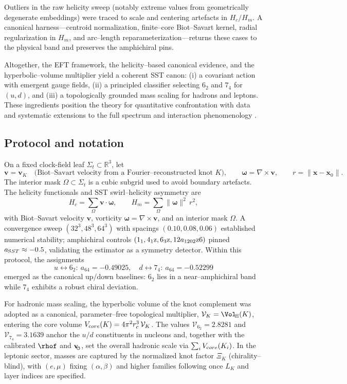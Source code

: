 \documentclass[11pt, preprint,titlepage]{revtex4-2}
\newcommand{\swirlarrow}{\!\!\scriptsize\boldsymbol{\circlearrowleft}}
\newcommand{\vswirl}{\mathbf{v}_{\swirlarrow}}
\begin{document}
    Outliers in the raw helicity sweep (notably extreme values from geometrically degenerate embeddings) were traced to scale and centering artefacts in \(H_c/H_m\). A canonical harness—centroid normalization, finite–core Biot–Savart kernel, radial regularization in \(H_m\), and arc–length reparameterization—returns these cases to the physical band and preserves the amphichiral pins.

    Altogether, the EFT framework, the helicity–based canonical evidence, and the hyperbolic–volume multiplier yield a coherent SST canon: (i) a covariant action with emergent gauge fields, (ii) a principled classifier selecting \(6_2\) and \(7_4\) for \((u,d)\), and (iii) a topologically grounded mass scaling for hadrons and leptons. These ingredients position the theory for quantitative confrontation with data and systematic extensions to the full spectrum and interaction phenomenology \cite{Barcelo2011,Volovik2003,Faddeev1997,Arnold1998}.

	\subsection{Protocol and notation}
    On a fixed clock-field leaf \(\Sigma_t\subset\mathbb{R}^3\), let
    \[
    \mathbf v=\mathbf v_K \quad\text{(Biot--Savart velocity from a Fourier–reconstructed knot \(K\))},\qquad
    \boldsymbol\omega=\nabla\times\mathbf v,\qquad
    r=\|\mathbf x-\mathbf x_0\|.
    \]
    The interior mask \(\Omega\subset\Sigma_t\) is a cubic subgrid used to avoid boundary artefacts. The helicity functionals and SST swirl–helicity asymmetry are
    \[
    H_c=\sum_{\Omega}\mathbf v\!\cdot\!\boldsymbol\omega,\qquad
    H_m=\sum_{\Omega}\|\boldsymbol\omega\|^2\,r^2,
    \]
    with Biot–Savart velocity \(\mathbf v\), vorticity \(\boldsymbol{\omega}=\nabla\times\mathbf v\), and an interior mask \(\Omega\). A convergence sweep \((32^3,48^3,64^3)\) with spacings \((0.10,0.08,0.06)\) established numerical stability; amphichiral controls \((1_1,4_1{\textrm z},6_3{\textrm z},12a_{1202}\textrm{z6})\) pinned \(a_{\textrm SST}\approx-0.5\), validating the estimator as a symmetry detector. Within this protocol, the assignments
    \[
        u \leftrightarrow 6_2:\ a_{64}=-0.49025,\quad
        d \leftrightarrow 7_4:\ a_{64}=-0.52299
    \]
    emerged as the canonical up/down baselines: \(6_2\) lies in a near–amphichiral band while \(7_4\) exhibits a robust chiral deviation.

    For hadronic mass scaling, the hyperbolic volume of the knot complement was adopted as a canonical, parameter–free topological multiplier,
    \(\mathcal{V}_K=\Vol_{\!\mathbb{H}}(K)\), entering the core volume \(V_{\textrm core}(K)=4\pi^2 r_c^3\,\mathcal{V}_K\).
    The values \(\mathcal{V}_{6_2}=2.8281\) and \(\mathcal{V}_{7_4}=3.1639\) anchor the \(u/d\) constituents in nucleons and, together with the calibrated \(\rhof\) and \(\vswirl\), set the overall hadronic scale via \(\sum_i V_{\textrm core}(K_i)\).
    In the leptonic sector, masses are captured by the normalized knot factor \(\Xi_K\) (chirality–blind), with \((e,\mu)\) fixing \((\alpha,\beta)\) and higher families following once \(L_K\) and layer indices are specified.
\end{document}

